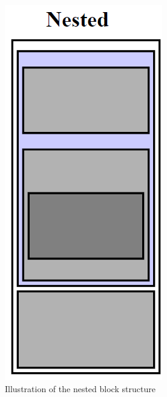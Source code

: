 	\begin{figure}
	\includegraphics[scale=1]{rapport/2/figures/nested_block_structure}
	\caption{Illustration of the nested block structure }
	\end{figure}
	
	
	
	
	
	
	
	
	
	
	
